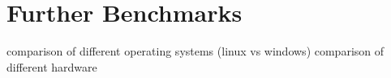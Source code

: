 \section{Further Benchmarks}

comparison of different operating systems (linux vs windows)
comparison of different hardware